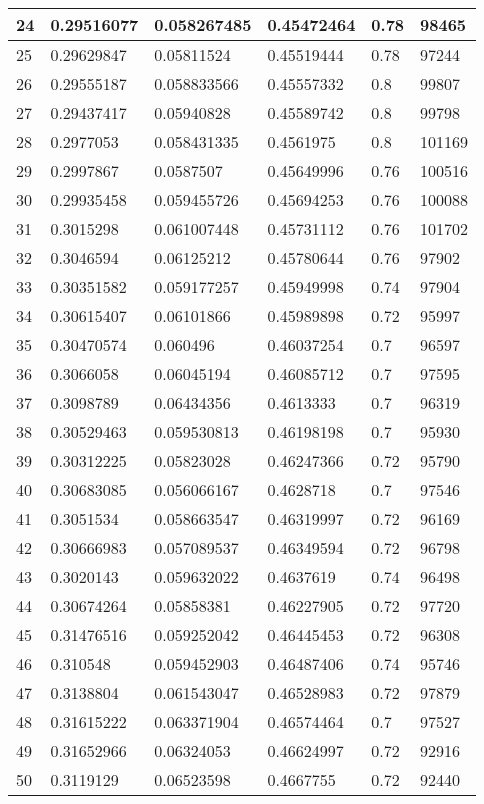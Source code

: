 \begin{longtable}{|l|l|l|l|l|l|}
24 & 0.29516077 & 0.058267485 & 0.45472464 & 0.78 & 98465 \\ \hline 
25 & 0.29629847 & 0.05811524 & 0.45519444 & 0.78 & 97244 \\ \hline 
26 & 0.29555187 & 0.058833566 & 0.45557332 & 0.8 & 99807 \\ \hline 
27 & 0.29437417 & 0.05940828 & 0.45589742 & 0.8 & 99798 \\ \hline 
28 & 0.2977053 & 0.058431335 & 0.4561975 & 0.8 & 101169 \\ \hline 
29 & 0.2997867 & 0.0587507 & 0.45649996 & 0.76 & 100516 \\ \hline 
30 & 0.29935458 & 0.059455726 & 0.45694253 & 0.76 & 100088 \\ \hline 
31 & 0.3015298 & 0.061007448 & 0.45731112 & 0.76 & 101702 \\ \hline 
32 & 0.3046594 & 0.06125212 & 0.45780644 & 0.76 & 97902 \\ \hline 
33 & 0.30351582 & 0.059177257 & 0.45949998 & 0.74 & 97904 \\ \hline 
34 & 0.30615407 & 0.06101866 & 0.45989898 & 0.72 & 95997 \\ \hline 
35 & 0.30470574 & 0.060496 & 0.46037254 & 0.7 & 96597 \\ \hline 
36 & 0.3066058 & 0.06045194 & 0.46085712 & 0.7 & 97595 \\ \hline 
37 & 0.3098789 & 0.06434356 & 0.4613333 & 0.7 & 96319 \\ \hline 
38 & 0.30529463 & 0.059530813 & 0.46198198 & 0.7 & 95930 \\ \hline 
39 & 0.30312225 & 0.05823028 & 0.46247366 & 0.72 & 95790 \\ \hline 
40 & 0.30683085 & 0.056066167 & 0.4628718 & 0.7 & 97546 \\ \hline 
41 & 0.3051534 & 0.058663547 & 0.46319997 & 0.72 & 96169 \\ \hline 
42 & 0.30666983 & 0.057089537 & 0.46349594 & 0.72 & 96798 \\ \hline 
43 & 0.3020143 & 0.059632022 & 0.4637619 & 0.74 & 96498 \\ \hline 
44 & 0.30674264 & 0.05858381 & 0.46227905 & 0.72 & 97720 \\ \hline 
45 & 0.31476516 & 0.059252042 & 0.46445453 & 0.72 & 96308 \\ \hline 
46 & 0.310548 & 0.059452903 & 0.46487406 & 0.74 & 95746 \\ \hline 
47 & 0.3138804 & 0.061543047 & 0.46528983 & 0.72 & 97879 \\ \hline 
48 & 0.31615222 & 0.063371904 & 0.46574464 & 0.7 & 97527 \\ \hline 
49 & 0.31652966 & 0.06324053 & 0.46624997 & 0.72 & 92916 \\ \hline 
50 & 0.3119129 & 0.06523598 & 0.4667755 & 0.72 & 92440 \\ \hline 
\end{longtable}